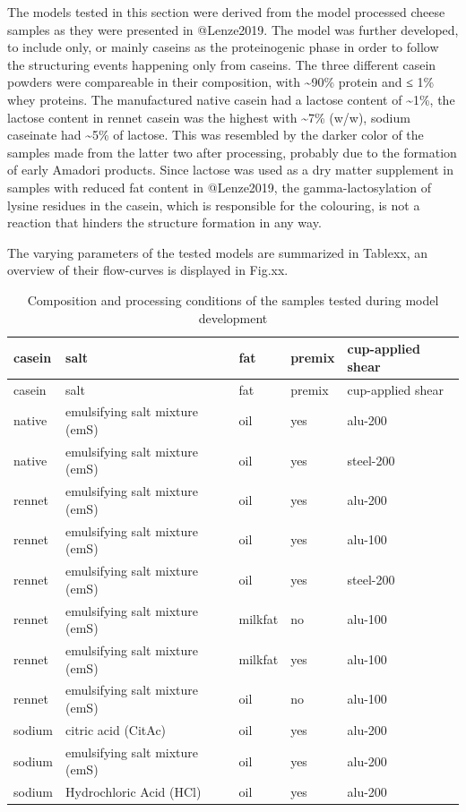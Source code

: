 \documentclass[
]{article}
\begin{document}
The models tested in this section were derived from the model processed
cheese samples as they were presented in @Lenze2019. The model was
further developed, to include only, or mainly caseins as the
proteinogenic phase in order to follow the structuring events happening
only from caseins. The three different casein powders were compareable
in their composition, with \textasciitilde90\% protein and ≤ 1\% whey
proteins. The manufactured native casein had a lactose content of
\textasciitilde1\%, the lactose content in rennet casein was the highest
with \textasciitilde7\% (w/w), sodium caseinate had \textasciitilde5\%
of lactose. This was resembled by the darker color of the samples made
from the latter two after processing, probably due to the formation of
early Amadori products. Since lactose was used as a dry matter
supplement in samples with reduced fat content in @Lenze2019, the
gamma-lactosylation of lysine residues in the casein, which is
responsible for the colouring, is not a reaction that hinders the
structure formation in any way.

The varying parameters of the tested models are summarized in Tablexx,
an overview of their flow-curves is displayed in Fig.xx.

\begin{longtable}[]{@{}lllll@{}}
\caption{Composition and processing conditions of the samples tested
during model development}\tabularnewline
\toprule
casein & salt & fat & premix & cup-applied shear \\
\midrule
\endfirsthead
\toprule
casein & salt & fat & premix & cup-applied shear \\
\midrule
\endhead
native & emulsifying salt mixture (emS) & oil & yes & alu-200 \\
native & emulsifying salt mixture (emS) & oil & yes & steel-200 \\
rennet & emulsifying salt mixture (emS) & oil & yes & alu-200 \\
rennet & emulsifying salt mixture (emS) & oil & yes & alu-100 \\
rennet & emulsifying salt mixture (emS) & oil & yes & steel-200 \\
rennet & emulsifying salt mixture (emS) & milkfat & no & alu-100 \\
rennet & emulsifying salt mixture (emS) & milkfat & yes & alu-100 \\
rennet & emulsifying salt mixture (emS) & oil & no & alu-100 \\
sodium & citric acid (CitAc) & oil & yes & alu-200 \\
sodium & emulsifying salt mixture (emS) & oil & yes & alu-200 \\
sodium & Hydrochloric Acid (HCl) & oil & yes & alu-200 \\
\bottomrule
\end{longtable}
\end{document}
